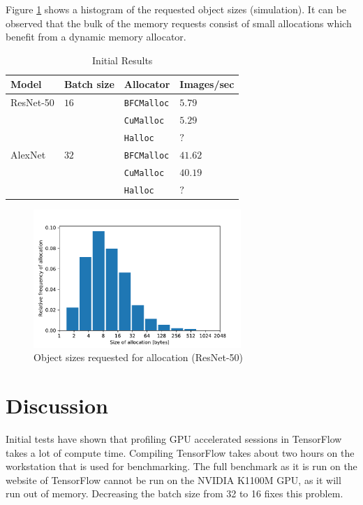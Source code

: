 \documentclass[12pt,twoside]{article}
\newcommand{\resnettimebfc}{$5.79$}     %
\newcommand{\resnettimecuda}{$5.29$}    %
\newcommand{\resnettimehalloc}{$?$}     %
\newcommand{\alexnettimebfc}{$41.62$}   %
\newcommand{\alexnettimecuda}{$40.19$}  %
\newcommand{\alexnettimehalloc}{$?$}    %
\begin{document}
Figure \ref{fig:hist} shows a histogram of the requested object sizes (simulation). It can be observed that the bulk of the memory requests consist of small allocations which benefit from a dynamic memory allocator.

\begin{table}[!ht]
\centering
\caption{Initial Results}
\label{tab:results}
\begin{tabular}{|l|l|l|l|}
\hline
Model     & Batch size  & Allocator          & Images/sec         \\ \hline
ResNet-50 & $16$        & \texttt{BFCMalloc} & \resnettimebfc     \\ \cline{3-4} 
          &             & \texttt{CuMalloc}  & \resnettimecuda    \\ \cline{3-4} 
          &             & \texttt{Halloc}    & \resnettimehalloc  \\ \hline
AlexNet   & $32$        & \texttt{BFCMalloc} & \alexnettimebfc    \\ \cline{3-4} 
          &             & \texttt{CuMalloc}  & \alexnettimecuda   \\ \cline{3-4} 
          &             & \texttt{Halloc}    & \alexnettimehalloc \\ \hline
\end{tabular}
\end{table}

\begin{figure}[!ht]
  \centering
    \includegraphics[width=0.7\textwidth]{../Quantitative Python/histogram.pdf}
  \caption{Object sizes requested for allocation (ResNet-50)}
  \label{fig:hist}
\end{figure}

\section{Discussion}
\label{sec:discussion}
Initial tests have shown that profiling GPU accelerated sessions in TensorFlow takes a lot of compute time. Compiling TensorFlow takes about two hours on the workstation that is used for benchmarking. The full benchmark as it is run on the website of TensorFlow cannot be run on the NVIDIA K1100M GPU, as it will run out of memory. Decreasing the batch size from 32 to 16 fixes this problem.
\end{document}
